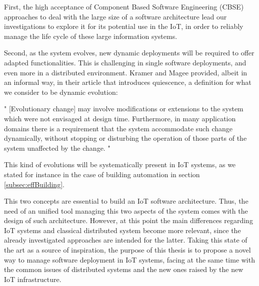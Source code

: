 First, the high acceptance of Component Based Software Engineering (CBSE)\cite{crnkovic2002building} approaches to deal with the large size of a software architecture lead our investigations to explore it for its potential use in the IoT, in order to reliably manage the life cycle of these large information systems.

Second, as the system evolves, new dynamic deployments will be required to offer adapted functionalities.
This is challenging in single software deployments, and even more in a distributed environment.
Kramer and Magee\cite{kramer1990evolving} provided, albeit in an informal way, in their article that introduces quiescence, a definition for what we consider to be dynamic evolution:
\begin{citeverbatim}
	" [Evolutionary change] may involve modifications or extensions to the system which were not envisaged at design time.
	Furthermore, in many application domains there is a requirement that the system accommodate such change dynamically, without stopping or disturbing the operation of those parts of the system unaffected by the change. "
\end{citeverbatim}
This kind of evolutions will be systematically present in IoT systems, as we stated for instance in the case of building automation in section \ref{subsec:effBuilding}.

This two concepts are essential to build an IoT software architecture.
Thus, the need of an unified tool managing this two aspects of the system comes with the design of such architecture.
However, at this point the main differences regarding IoT systems and classical distributed system become more relevant, since the already investigated approaches are intended for the latter.
Taking this state of the art as a source of inspiration, the purpose of this thesis is to propose a novel way to manage software deployment in IoT systems, facing at the same time with the common issues of distributed systems and the new ones raised by the new IoT infrastructure.

